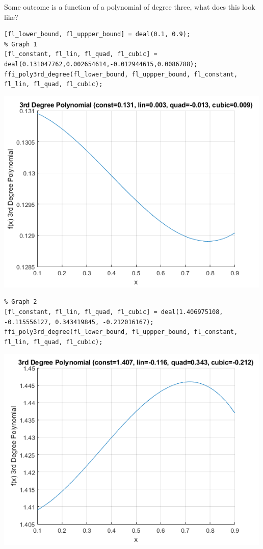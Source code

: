 \documentclass[
]{book}
\begin{document}
Some outcome is a function of a polynomial of degree three, what does
this look like?

\begin{verbatim}
[fl_lower_bound, fl_uppper_bound] = deal(0.1, 0.9);
% Graph 1
[fl_constant, fl_lin, fl_quad, fl_cubic] = deal(0.131047762,0.002654614,-0.012944615,0.0086788);
ffi_poly3rd_degree(fl_lower_bound, fl_uppper_bound, fl_constant, fl_lin, fl_quad, fl_cubic);
\end{verbatim}

\includegraphics[width=5.20833in,height=\textheight]{img/polynomial_images/figure_2.png}

\begin{verbatim}
% Graph 2
[fl_constant, fl_lin, fl_quad, fl_cubic] = deal(1.406975108, -0.115556127, 0.343419845, -0.212016167);
ffi_poly3rd_degree(fl_lower_bound, fl_uppper_bound, fl_constant, fl_lin, fl_quad, fl_cubic);
\end{verbatim}

\includegraphics[width=5.20833in,height=\textheight]{img/polynomial_images/figure_3.png}
\end{document}
